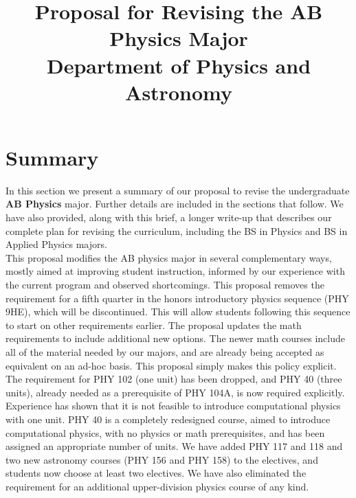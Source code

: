 \documentclass[12pt]{article}
\begin{document}
\title{Proposal for Revising the AB Physics Major \\
Department of Physics and Astronomy}

\maketitle

\section*{Summary}

\noindent
In this section we present a summary of our proposal to revise the
undergraduate {\bf AB Physics} major.  Further details are included in
the sections that follow.  We have also
provided, along with this brief, a longer write-up that describes our
complete plan for revising the curriculum, including the BS in Physics
and BS in Applied Physics majors.\\[5pt]

\noindent
This proposal modifies the AB physics major in several complementary ways, mostly aimed at improving
student instruction, informed by our experience with the current program and observed shortcomings.
This proposal removes the requirement for a fifth quarter in the honors introductory physics
sequence (PHY 9HE), which will be discontinued.  This will allow students following this sequence to
start on other requirements earlier.  The proposal updates the math requirements to include
additional new options.  The newer math courses include all of the material needed by our majors,
and are already being accepted as equivalent on an ad-hoc basis.  This proposal simply makes this
policy explicit.  The requirement for PHY 102 (one unit) has been dropped, and PHY 40
(three units), already needed as a prerequisite of PHY 104A, is now
required explicitly.  Experience has shown that it is not feasible to
introduce computational physics with one unit.  PHY 40 is a completely
redesigned course, aimed to introduce computational physics, with no
physics or math prerequisites, and has been assigned an appropriate
number of units.  We have added PHY 117 and 118 and two new
astronomy courses (PHY 156 and PHY 158) to the electives, and students
now choose at least two electives.  We have also eliminated the
requirement for an additional upper-division physics course of any
kind.\\[5pt]
\end{document}
